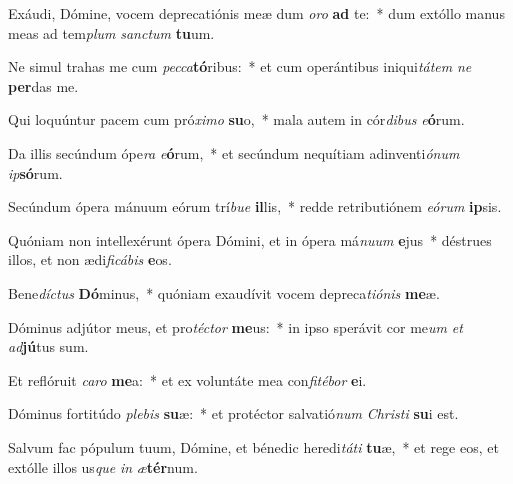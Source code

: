 \item Exáudi, Dómine, vocem deprecatiónis meæ dum \textit{o}\textit{ro} \textbf{ad} te:~* dum extóllo manus meas ad tem\textit{plum} \textit{sanc}\textit{tum} \textbf{tu}um.
\item Ne simul trahas me cum \textit{pec}\textit{ca}\textbf{tó}ribus:~* et cum operántibus iniqui\textit{tá}\textit{tem} \textit{ne} \textbf{per}das me.
\item Qui loquúntur pacem cum pró\textit{xi}\textit{mo} \textbf{su}o,~* mala autem in cór\textit{di}\textit{bus} \textit{e}\textbf{ó}rum.
\item Da illis secúndum ópe\textit{ra} \textit{e}\textbf{ó}rum,~* et secúndum nequítiam adinventi\textit{ó}\textit{num} \textit{ip}\textbf{só}rum.
\item Secúndum ópera mánuum eórum trí\textit{bu}\textit{e} \textbf{il}lis,~* redde retributiónem \textit{e}\textit{ó}\textit{rum} \textbf{ip}sis.
\item Quóniam non intellexérunt ópera Dómini, et in ópera má\textit{nu}\textit{um} \textbf{e}jus~* déstrues illos, et non ædi\textit{fi}\textit{cá}\textit{bis} \textbf{e}os.
\item Bene\textit{díc}\textit{tus} \textbf{Dó}minus,~* quóniam exaudívit vocem depreca\textit{ti}\textit{ó}\textit{nis} \textbf{me}æ.
\item Dóminus adjútor meus, et pro\textit{téc}\textit{tor} \textbf{me}us:~* in ipso sperávit cor me\textit{um} \textit{et} \textit{ad}\textbf{jú}tus sum.
\item Et reflóruit \textit{ca}\textit{ro} \textbf{me}a:~* et ex voluntáte mea con\textit{fi}\textit{té}\textit{bor} \textbf{e}i.
\item Dóminus fortitúdo \textit{ple}\textit{bis} \textbf{su}æ:~* et protéctor salvatió\textit{num} \textit{Chris}\textit{ti} \textbf{su}i est.
\item Salvum fac pópulum tuum, Dómine, et bénedic heredi\textit{tá}\textit{ti} \textbf{tu}æ,~* et rege eos, et extólle illos us\textit{que} \textit{in} \textit{æ}\textbf{tér}num.

